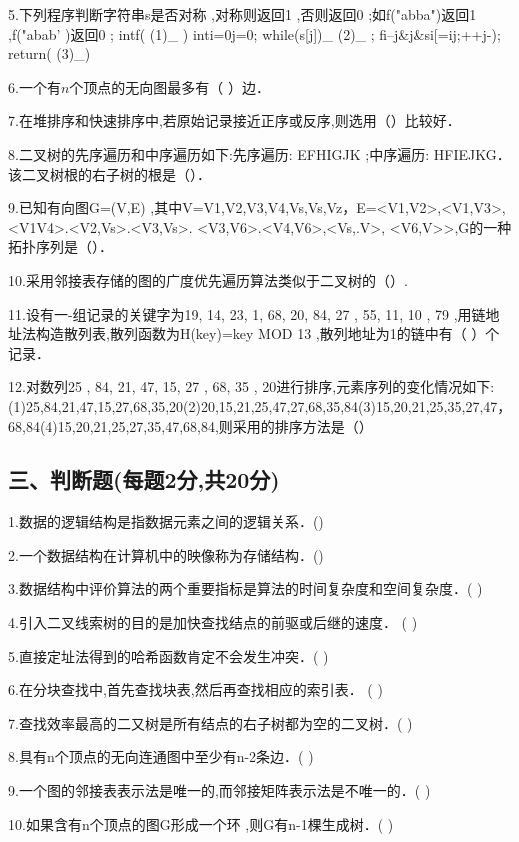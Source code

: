 5.下列程序判断字符串s是否对称 ,对称则返回1 ,否则返回0 ;如f("abba")返回1 ,f("abab' )返回0 ;
intf( (1)_ )
inti=0j=0;
while(s[j])_ (2)_ ;
fi--j&j&si[=ij;++j-);
return( (3)_)

6.一个有$n$个顶点的无向图最多有（  ）边．

7.在堆排序和快速排序中,若原始记录接近正序或反序,则选用（）比较好．

8.二叉树的先序遍历和中序遍历如下:先序遍历: EFHIGJK ;中序遍历: HFIEJKG． 该二叉树根的右子树的根是（）．

9.已知有向图G=(V,E) ,其中V={V1,V2,V3,V4,Vs,Vs,Vz}，E={<V1,V2>,<V1,V3>,<V1V4>.<V2,Vs>.<V3,Vs>. <V3,V6>.<V4,V6>,<Vs,.V>, <V6,V>>},G的一种拓扑序列是（）．

10.采用邻接表存储的图的广度优先遍历算法类似于二叉树的（）.

11.设有一-组记录的关键字为{19, 14, 23, 1, 68, 20, 84, 27 , 55, 11, 10 , 79} ,用链地址法构造散列表,散列函数为H(key)=key MOD 13 ,散列地址为1的链中有（  ）个记录．

12.对数列{25 , 84, 21, 47, 15, 27 , 68, 35 , 20}进行排序,元素序列的变化情况如下:
(1)25,84,21,47,15,27,68,35,20(2)20,15,21,25,47,27,68,35,84(3)15,20,21,25,35,27,47，68,84(4)15,20,21,25,27,35,47,68,84,则采用的排序方法是（）

\subsection{三、判断题(每题2分,共20分)}
1.数据的逻辑结构是指数据元素之间的逻辑关系．()

2.一个数据结构在计算机中的映像称为存储结构．()

3.数据结构中评价算法的两个重要指标是算法的时间复杂度和空间复杂度．( )

4.引入二叉线索树的目的是加快查找结点的前驱或后继的速度． ( )

5.直接定址法得到的哈希函数肯定不会发生冲突．( )

6.在分块查找中,首先查找块表,然后再查找相应的索引表． ( )

7.查找效率最高的二又树是所有结点的右子树都为空的二叉树．( )

8.具有n个顶点的无向连通图中至少有n-2条边．( )

9.一个图的邻接表表示法是唯一的,而邻接矩阵表示法是不唯一的．( )

10.如果含有n个顶点的图G形成一个环 ,则G有n-1棵生成树．( )

